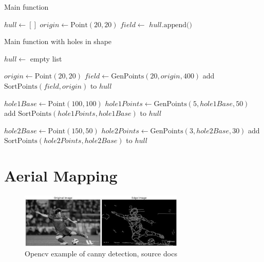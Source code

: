 \documentclass[final]{cmpreport_02}
\begin{document}
\begin{algorithm}[h!]
	\caption{Main function}
	\label{mg:main}
	\begin{algorithmic}[1]
		\State $hull \gets []$
		\State $origin \gets \text{Point}(20, 20)$
		\State $field \gets$ 
		\State $hull.\text{append}($$)$
		\EndFunction
	\end{algorithmic}
\end{algorithm}

\begin{algorithm}[h!]
	\caption{Main function with holes in shape}
	\label{mg:mainWithHoles}
	\begin{algorithmic}[1]
		\State $hull \gets$ empty list

		\State $origin \gets \text{Point}(20, 20)$
		\State $field \gets \text{GenPoints}(20, origin, 400)$
		\State add $\text{SortPoints}(field, origin)$ to $hull$

		\State $hole1Base \gets \text{Point}(100, 100)$
		\State $hole1Points \gets \text{GenPoints}(5, hole1Base, 50)$
		\State add $\text{SortPoints}(hole1Points, hole1Base)$ to $hull$

		\State $hole2Base \gets \text{Point}(150, 50)$
		\State $hole2Points \gets \text{GenPoints}(3, hole2Base, 30)$
		\State add $\text{SortPoints}(hole2Points, hole2Base)$ to $hull$
		\EndProcedure
	\end{algorithmic}
\end{algorithm}


\clearpage
\section{Aerial Mapping}

\begin{figure}[h!]
	\centering
	\includegraphics[width=0.7\textwidth]{./images/openCvCannyExample.jpg}
	\caption{Opencv example of canny detection, source \citep{opencv_library} docs}
	\label{am:cannyexample}
\end{figure}
\end{document}
